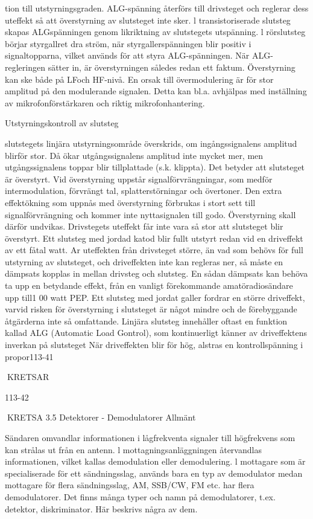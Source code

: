 \documentclass[a4paper,twoside,twocolumn,openright]{book}
\begin{document}
{{{{{{{tion till utstyrningsgraden. ALG-spänning
återförs till drivsteget och reglerar dess uteffekt så att överstyrning av slutsteget inte
sker. l transistoriserade slutsteg skapas ALGspänningen genom likriktning av slutstegets
utspänning. l rörslutsteg börjar styrgallret
dra ström, när styrgallerspänningen blir positiv i signaltopparna, vilket används för att
styra ALG-spänningen. När ALG-regleringen
sätter in, är överstyrningen således redan ett
faktum. Överstyrning kan ske både på LFoch HF-nivå.
En orsak till övermodulering är för stor
amplitud på den modulerande signalen. Detta
kan bl.a. avhjälpas med inställning av
mikrofonförstärkaren och riktig mikrofonhantering.

Utstyrningskontroll av slutsteg

slutstegets linjära utstyrningsområde överskrids, om ingångssignalens amplitud blirför
stor. Då ökar utgångssignalens amplitud inte
mycket mer, men utgångssignalens toppar
blir tillplattade (s.k. klippta). Det betyder att
slutsteget är överstyrt.
Vid överstyrning uppstår signalförvrängningar, som medför intermodulation, förvrängt tal, splatterstörningar och övertoner.
Den extra effektökning som uppnås med
överstyrning förbrukas i stort sett till signalförvrängning och kommer inte nyttasignalen
till godo. Överstyrning skall därför undvikas.
Drivstegets uteffekt får inte vara så stor
att slutsteget blir överstyrt. Ett slutsteg med
jordad katod blir fullt utstyrt redan vid en
driveffekt av ett fåtal watt. Ar uteffekten från
drivsteget större, än vad som behövs för full
utstyrning av slutsteget, och driveffekten inte
kan regleras ner, så måste en dämpsats
kopplas in mellan drivsteg och slutsteg. En
sådan dämpsats kan behöva ta upp en betydande effekt, från en vanligt förekommande
amatöradiosändare upp till1 00 watt PEP.
Ett slutsteg med jordat galler fordrar en
större driveffekt, varvid risken för överstyrning i slutsteget är något mindre och de
förebyggande åtgärderna inte så omfattande.
Linjära slutsteg innehåller oftast en funktion kallad ALG (Automatic Load Gontrol),
som kontinuerligt känner av driveffektens
inverkan på slutsteget När driveffekten blir
för hög, alstras en kontrollspänning i propor113-41

KRETSAR

113-42

KRETSA
3.5 Detektorer - Demodulatorer
Allmänt

Sändaren omvandlar informationen i lågfrekventa signaler till högfrekvens som kan
strålas ut från en antenn. l mottagningsanläggningen återvandlas informationen, vilket kallas demodulation eller demodulering.
l mottagare som är specialiserade för ett
sändningsslag, används bara en typ av demodulator medan mottagare för flera sändningsslag, AM, SSB/CW, FM etc. har flera
demodulatorer. Det finns många typer och
namn på demodulatorer, t.ex. detektor, diskriminator. Här beskrivs några av dem.

}}}}}}}
\end{document}
